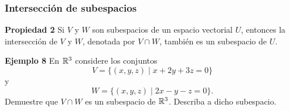 \begin{frame}\frametitle{Intersección de subespacios}

\begin{prop}{\textbf{Propiedad 2}}
	\justifying
	Si $V$ y $W$ son subespacios de un espacio vectorial $U$, entonces la intersección de $V$ y $W$,
	denotada por $V\cap W$, también es un subespacio de $U$.
\end{prop}

\begin{ej}{\textbf{Ejemplo 8}}\justifying
	En $\mathbb{R}^3$ considere los conjuntos
	\[
		V = \{ (x,y,z) \mid x+2y+3z = 0 \}
	\]
	y
	\[
		W = \{ (x,y,z) \mid  2x-y-z = 0 \}.
	\]
	Demuestre que $V\cap W$ es un subespacio de $\mathbb{R}^3$. Describa a dicho subespacio.
\end{ej}

\end{frame}
